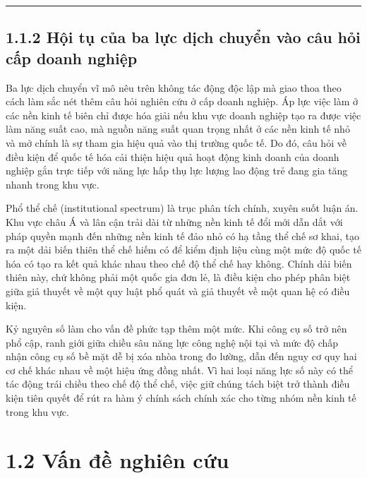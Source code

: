 \documentclass[
  a4paper,
  13pt]{extreport}
\begin{document}
\begin{center}\rule{0.5\linewidth}{0.5pt}\end{center}

\hypertarget{hux1ed9i-tux1ee5-cux1ee7a-ba-lux1ef1c-dux1ecbch-chuyux1ec3n-vuxe0o-cuxe2u-hux1ecfi-cux1ea5p-doanh-nghiux1ec7p}{%
\subsection{1.1.2 Hội tụ của ba lực dịch chuyển vào câu hỏi cấp doanh
nghiệp}\label{hux1ed9i-tux1ee5-cux1ee7a-ba-lux1ef1c-dux1ecbch-chuyux1ec3n-vuxe0o-cuxe2u-hux1ecfi-cux1ea5p-doanh-nghiux1ec7p}}

Ba lực dịch chuyển vĩ mô nêu trên không tác động độc lập mà giao thoa
theo cách làm sắc nét thêm câu hỏi nghiên cứu ở cấp doanh nghiệp. Áp lực
việc làm ở các nền kinh tế biên chỉ được hóa giải nếu khu vực doanh
nghiệp tạo ra được việc làm năng suất cao, mà nguồn năng suất quan trọng
nhất ở các nền kinh tế nhỏ và mở chính là sự tham gia hiệu quả vào thị
trường quốc tế. Do đó, câu hỏi về điều kiện để quốc tế hóa cải thiện
hiệu quả hoạt động kinh doanh của doanh nghiệp gắn trực tiếp với năng
lực hấp thụ lực lượng lao động trẻ đang gia tăng nhanh trong khu vực.

Phổ thể chế (institutional spectrum) là trục phân tích chính, xuyên suốt
luận án. Khu vực châu Á và lân cận trải dài từ những nền kinh tế đổi mới
dẫn dắt với pháp quyền mạnh đến những nền kinh tế đảo nhỏ có hạ tầng thể
chế sơ khai, tạo ra một dải biến thiên thể chế hiếm có để kiểm định liệu
cùng một mức độ quốc tế hóa có tạo ra kết quả khác nhau theo chế độ thể
chế hay không. Chính dải biến thiên này, chứ không phải một quốc gia đơn
lẻ, là điều kiện cho phép phân biệt giữa giả thuyết về một quy luật phổ
quát và giả thuyết về một quan hệ có điều kiện.

Kỷ nguyên số làm cho vấn đề phức tạp thêm một mức. Khi công cụ số trở
nên phổ cập, ranh giới giữa chiều sâu năng lực công nghệ nội tại và mức
độ chấp nhận công cụ số bề mặt dễ bị xóa nhòa trong đo lường, dẫn đến
nguy cơ quy hai cơ chế khác nhau về một hiệu ứng đồng nhất. Vì hai loại
năng lực số này có thể tác động trái chiều theo chế độ thể chế, việc giữ
chúng tách biệt trở thành điều kiện tiên quyết để rút ra hàm ý chính
sách chính xác cho từng nhóm nền kinh tế trong khu vực.

\hypertarget{vux1ea5n-ux111ux1ec1-nghiuxean-cux1ee9u}{%
\section{1.2 Vấn đề nghiên
cứu}\label{vux1ea5n-ux111ux1ec1-nghiuxean-cux1ee9u}}
\end{document}
